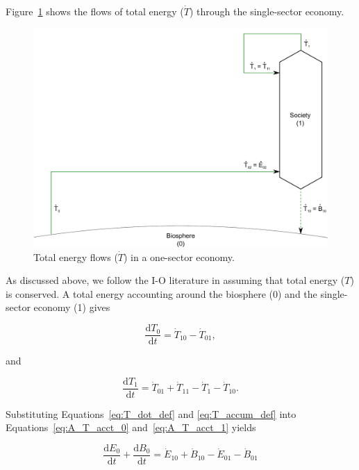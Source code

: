 Figure~\ref{fig:A_total_energy_T_dot} shows the flows 
of total energy ($\dot{T}$) through the single-sector economy.

\begin{figure}[!ht]
\includegraphics[width=1.0\linewidth]{Part_1/Chapter_Embodied/images/1_sector_embodied_energy.pdf}
\caption[Total energy flows in a one-sector economy]{Total energy flows ($\dot{T}$) in a one-sector economy.}
\label{fig:A_total_energy_T_dot}
\end{figure}

As discussed above, we follow the I-O literature in assuming that 
total energy ($T$) is conserved. 
A total energy accounting around the biosphere (0)
and the single-sector economy (1) gives

\begin{equation} \label{eq:A_T_acct_0}
	\frac{\mathrm{d}T_{0}}{\mathrm{d}t} 
	= \dot{T}_{10} 
	- \dot{T}_{01},
\end{equation}

\noindent and

\begin{equation} \label{eq:A_T_acct_1}
	\frac{\mathrm{d}T_{1}}{\mathrm{d}t} 
	= \dot{T}_{01} 
	+ \dot{T}_{11}
	- \dot{T}_{1}
	- \dot{T}_{10}.
\end{equation}

Substituting Equations~\ref{eq:T_dot_def} and
\ref{eq:T_accum_def} into 
Equations~\ref{eq:A_T_acct_0} and~\ref{eq:A_T_acct_1}
yields

\begin{equation} \label{eq:A_total_energy_0}
	\frac{\mathrm{d}E_{0}}{\mathrm{d}t} 
	+ \frac{\mathrm{d}B_{0}}{\mathrm{d}t} 
	= \dot{E}_{10} 
	+ \dot{B}_{10} 
	- \dot{E}_{01}
	- \dot{B}_{01}
\end{equation}

